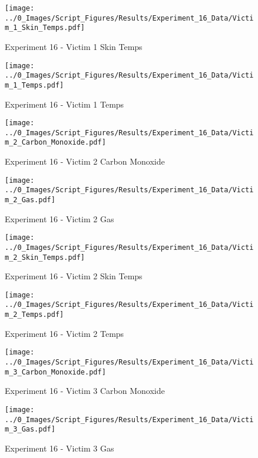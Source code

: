 	\begin{figure}[H]
		\centering
		\texttt{[image: ../0\_Images/Script\_Figures/Results/Experiment\_16\_Data/Victim\_1\_Skin\_Temps.pdf]}
		\caption[]{Experiment 16 - Victim 1 Skin Temps}
	\end{figure}
 
	\clearpage

	\begin{figure}[H]
		\centering
		\texttt{[image: ../0\_Images/Script\_Figures/Results/Experiment\_16\_Data/Victim\_1\_Temps.pdf]}
		\caption[]{Experiment 16 - Victim 1 Temps}
	\end{figure}
 

	\begin{figure}[H]
		\centering
		\texttt{[image: ../0\_Images/Script\_Figures/Results/Experiment\_16\_Data/Victim\_2\_Carbon\_Monoxide.pdf]}
		\caption[]{Experiment 16 - Victim 2 Carbon Monoxide}
	\end{figure}
 
	\clearpage

	\begin{figure}[H]
		\centering
		\texttt{[image: ../0\_Images/Script\_Figures/Results/Experiment\_16\_Data/Victim\_2\_Gas.pdf]}
		\caption[]{Experiment 16 - Victim 2 Gas}
	\end{figure}
 

	\begin{figure}[H]
		\centering
		\texttt{[image: ../0\_Images/Script\_Figures/Results/Experiment\_16\_Data/Victim\_2\_Skin\_Temps.pdf]}
		\caption[]{Experiment 16 - Victim 2 Skin Temps}
	\end{figure}
 
	\clearpage

	\begin{figure}[H]
		\centering
		\texttt{[image: ../0\_Images/Script\_Figures/Results/Experiment\_16\_Data/Victim\_2\_Temps.pdf]}
		\caption[]{Experiment 16 - Victim 2 Temps}
	\end{figure}
 

	\begin{figure}[H]
		\centering
		\texttt{[image: ../0\_Images/Script\_Figures/Results/Experiment\_16\_Data/Victim\_3\_Carbon\_Monoxide.pdf]}
		\caption[]{Experiment 16 - Victim 3 Carbon Monoxide}
	\end{figure}
 
	\clearpage

	\begin{figure}[H]
		\centering
		\texttt{[image: ../0\_Images/Script\_Figures/Results/Experiment\_16\_Data/Victim\_3\_Gas.pdf]}
		\caption[]{Experiment 16 - Victim 3 Gas}
	\end{figure}
 

